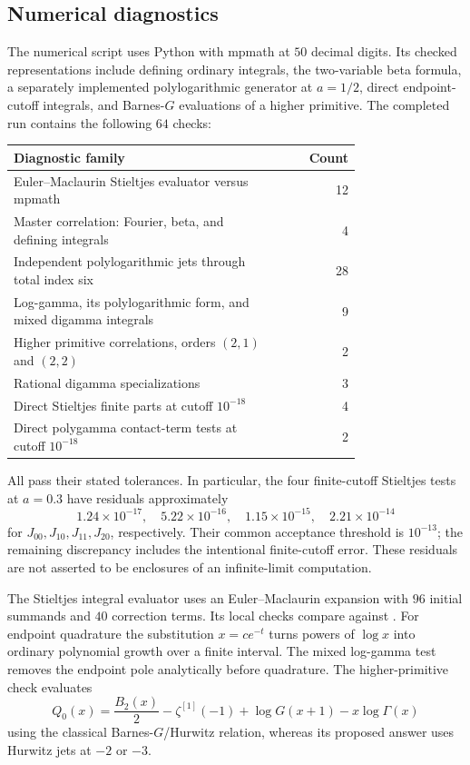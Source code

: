 \subsection{Numerical diagnostics}
The numerical script uses Python with mpmath at $50$ decimal digits. Its checked representations include defining ordinary integrals, the two-variable beta formula, a separately implemented polylogarithmic generator at $a=1/2$, direct endpoint-cutoff integrals, and Barnes-$G$ evaluations of a higher primitive. The completed run contains the following $64$ checks:
\begin{center}
\begin{tabular}{@{}p{0.76\linewidth}r@{}}
\toprule
Diagnostic family & Count\\
\midrule
Euler--Maclaurin Stieltjes evaluator versus mpmath & 12\\
Master correlation: Fourier, beta, and defining integrals & 4\\
Independent polylogarithmic jets through total index six & 28\\
Log-gamma, its polylogarithmic form, and mixed digamma integrals & 9\\
Higher primitive correlations, orders $(2,1)$ and $(2,2)$ & 2\\
Rational digamma specializations & 3\\
Direct Stieltjes finite parts at cutoff $10^{-18}$ & 4\\
Direct polygamma contact-term tests at cutoff $10^{-18}$ & 2\\
\bottomrule
\end{tabular}
\end{center}
All pass their stated tolerances. In particular, the four finite-cutoff Stieltjes tests at $a=0.3$ have residuals approximately
\[
1.24\times10^{-17},\quad 5.22\times10^{-16},\quad
1.15\times10^{-15},\quad 2.21\times10^{-14}
\]
for $J_{00},J_{10},J_{11},J_{20}$, respectively. Their common acceptance threshold is $10^{-13}$; the remaining discrepancy includes the intentional finite-cutoff error. These residuals are not asserted to be enclosures of an infinite-limit computation.

The Stieltjes integral evaluator uses an Euler--Maclaurin expansion with $96$ initial summands and $40$ correction terms. Its local checks compare against . For endpoint quadrature the substitution $x=c e^{-t}$ turns powers of $\log x$ into ordinary polynomial growth over a finite interval. The mixed log-gamma test removes the endpoint pole analytically before quadrature. The higher-primitive check evaluates
\[
Q_0(x)=\frac{B_2(x)}2-\zeta^{[1]}(-1)
+\log G(x+1)-x\log\Gamma(x)
\]
using the classical Barnes-$G$/Hurwitz relation, whereas its proposed answer uses Hurwitz jets at $-2$ or $-3$.

